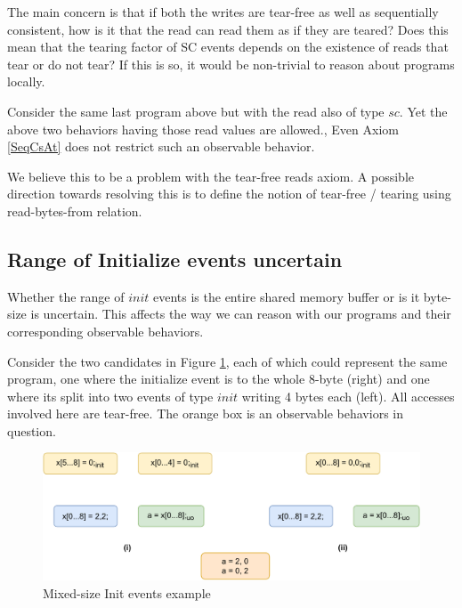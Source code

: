         The main concern is that if both the writes are tear-free as well as sequentially consistent, how is it that the read can read them as if they are teared?
        Does this mean that the tearing factor of SC events depends on the existence of reads that tear or do not tear? 
        If this is so, it would be non-trivial to reason about programs locally.
       
        Consider the same last program above but with the read also of type $sc$. 
        Yet the above two behaviors having those read values are allowed.,
        Even Axiom \ref{SeqCsAt} does not restrict such an observable behavior.

        We believe this to be a problem with the tear-free reads axiom.
        A possible direction towards resolving this is to define the notion of tear-free / tearing using read-bytes-from relation. 

    \subsection{Range of Initialize events uncertain}

        Whether the range of $init$ events is the entire shared memory buffer or is it byte-size is uncertain.
        This affects the way we can reason with our programs and their corresponding observable behaviors.

        Consider the two candidates in Figure \ref{crit:range}, each of which could represent the same program, one where the initialize event is to the whole 8-byte (right) and one where its split into two events of type $init$ writing 4 bytes each (left).
        All accesses involved here are tear-free.
        The orange box is an observable behaviors in question.
        \begin{figure}[H]
            \centering
            \includegraphics[scale=0.7]{6.ConclusionFutureWork/InitExample.pdf}
            \caption{Mixed-size Init events example}
            \label{crit:range}
        \end{figure}

